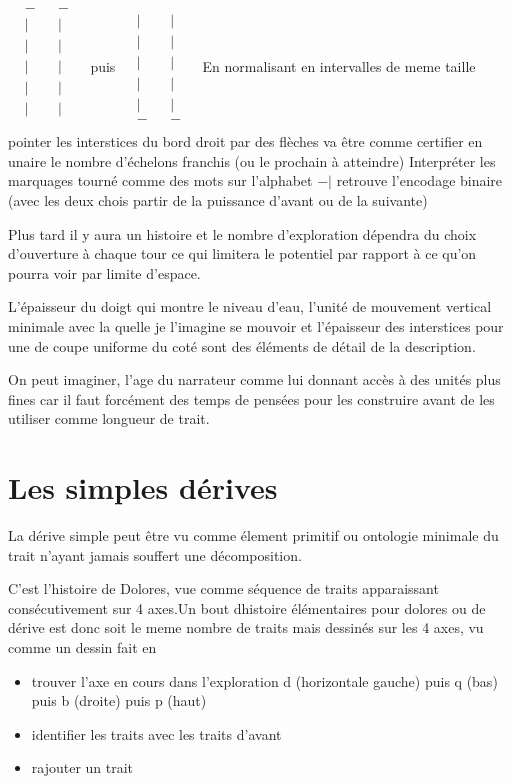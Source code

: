 \documentclass{article}
\begin{document}
 $\begin{matrix}
  &-&&-&\\
  &|&&|&\\
  &|&&|&\\
  &|&&|&\\
  &|&&|&\\
  &|&&|&\\
  &&&&\\
 \end{matrix}$ puis 
 $\begin{matrix}
  &&&&\\
 &|&&|&\\
  &|&&|&\\
  &|&&|&\\
  &|&&|&\\
  &|&&|&\\
  &-&&-&\\
 \end{matrix}$ 
  En normalisant en intervalles de meme taille pointer les interstices du bord droit  par des flèches va être comme certifier  en unaire le nombre d'échelons franchis 
  (ou le prochain à atteindre) 
  Interpréter les marquages tourné comme des mots sur l'alphabet $-|$ retrouve l'encodage binaire (avec les deux chois partir de la puissance d'avant ou de la suivante)
   
   
 Plus tard il y aura un histoire et le nombre d'exploration dépendra du choix d'ouverture à chaque tour  ce qui limitera le potentiel par rapport à ce qu'on pourra voir  par limite d'espace.

L'épaisseur du doigt qui montre le niveau d'eau, l'unité de mouvement vertical minimale avec la quelle je l'imagine se mouvoir  et l'épaisseur des interstices pour une de coupe uniforme du coté sont des éléments de détail de la description.

On peut imaginer, l'age du narrateur comme  lui donnant  accès à des unités plus fines car il faut forcément des temps de pensées pour les construire avant de les utiliser comme longueur de trait. 

\section{ Les simples dérives}
La dérive simple peut être vu comme élement primitif ou ontologie minimale du trait n'ayant jamais souffert une décomposition.

C'est l'histoire de Dolores, vue comme séquence de traits apparaissant consécutivement sur 4 axes.Un bout dhistoire élémentaires pour dolores ou de dérive est donc   soit le meme nombre de traits mais dessinés sur les 4 axes, vu comme un dessin fait en
\begin{itemize}
\item  trouver l'axe en cours dans l'exploration d (horizontale gauche) puis  q (bas) puis  b (droite) puis  p (haut)  
 \item  identifier les traits avec les traits d'avant
\item rajouter un  trait 
 \end{itemize}
\end{document}
